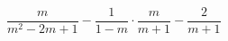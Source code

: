 \begin{ex}[type=expression]
	\begin{condition}
		\(\dfrac{m}{m^2-2m+1}-\dfrac{1}{1-m}\cdot\dfrac{m}{m+1}-\dfrac{2}{m+1}\)
	\end{condition}
\end{ex}